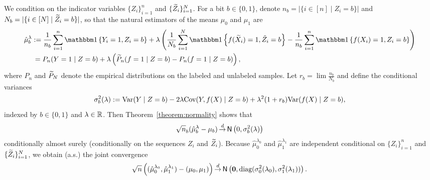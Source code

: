 We condition on the indicator variables $\{Z_i\}_{i=1}^n$ and
$\{\widetilde{Z}_i\}_{i=1}^N$.
For a bit $b \in \{0, 1\}$, denote
$n_b = |\{i \in [n] \mid Z_i = b\}|$
and $N_b = |\{i \in [N] \mid \widetilde{Z}_i = b\}|$,
so that the natural estimators of the means
$\mu_0$ and $\mu_1$ are
\begin{align*}
  \hat{\mu}_b^\lambda
  & \defeq
  \frac{1}{n_b} \sum_{i=1}^n \ind{Y_i = 1, Z_i = b} +
  \lambda \left(\frac{1}{N_b} \sum_{i=1}^N \ind{f(\Xt_i)=1, \tilde Z_i = b} -
  \frac{1}{n_b} \sum_{i=1}^n \ind{f(X_i)=1,  Z_i = b} \right) \\
  & \,=
  P_n(Y = 1 \mid Z = b) + \lambda\left(\wt{P}_n(f = 1 \mid Z = b)
  - P_n(f = 1 \mid Z = b)\right),
\end{align*}
where $P_n$ and $\widetilde{P}_N$ denote the empirical distributions
on the labeled and unlabeled samples.
Let
$r_b = \lim \frac{n_b}{N_b}$
and define the
conditional variances
\begin{equation*}
  \sigma_b^2(\lambda)
  := {\rm Var}(Y \mid Z = b)
  - 2 \lambda \textup{Cov}(Y, f(X) \mid Z = b)
  + \lambda^2 (1 + r_b) {\rm Var}(f(X) \mid Z = b),
\end{equation*}
indexed by $b \in \{0, 1\}$ and $\lambda \in \mathbb{R}$.
Then
Theorem~\ref{theorem:normality} shows that
\begin{align*}
  \sqrt{n}_b (\hat{\mu}_b^\lambda - \mu_b)
  \mathop{\stackrel{d}{\rightarrow}} \mathsf{N}\left(0, \sigma^2_b(\lambda)\right)
\end{align*}
conditionally almost surely (conditionally on the sequences
$Z_i$ and $\widetilde{Z}_i$).
Because $\hat{\mu}_0^{\lambda_0}$ and $\hat{\mu}_1^{\lambda_1}$ are
independent conditional on $\{Z_i\}_{i=1}^n$ and $\{\widetilde{Z}_i\}_{i=1}^N$,
we obtain (a.s.) the joint convergence
\begin{equation*}
  \sqrt{n}\left((\hat{\mu}^{\lambda_0}_0 , \hat{\mu}^{\lambda_1}_1)
  - (\mu_0, \mu_1)
  \right)
  \mathop{\stackrel{d}{\rightarrow}} \mathsf{N}\left(\mathbf{0},
  \textup{diag}(\sigma_0^2(\lambda_0), \sigma_1^2(\lambda_1))\right).
\end{equation*}
